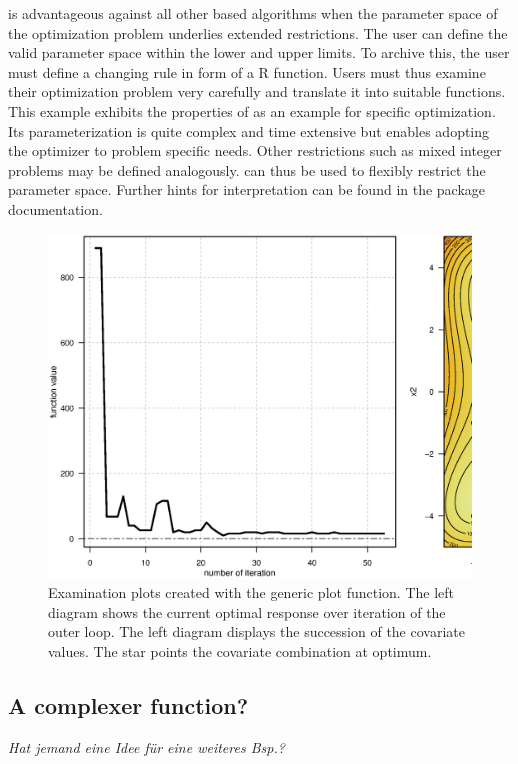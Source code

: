  is advantageous against all other  based algorithms when the parameter space of the optimization problem underlies extended restrictions. The user can define the valid parameter space within the lower and upper limits. To archive this, the user must define a changing rule in form of a R function. Users must thus examine their optimization problem very carefully and translate it into suitable functions. This example exhibits the properties of  as an example for specific optimization. Its parameterization is quite complex and time extensive but enables adopting the optimizer to problem specific needs. Other restrictions such as mixed integer problems may be defined analogously.  can thus be used to flexibly restrict the parameter space. Further hints for interpretation can be found in the package documentation.

\begin{figure}[htbp]
	\centering
	\includegraphics[width=1.01\textwidth]{Fig/fig2-ex2-plot.eps}
	\caption{Examination plots created with the generic plot function. The left diagram shows the current optimal response over iteration of the outer loop. The left diagram displays the succession of the covariate values. The star points the covariate combination at optimum.}
	\label{fig:fig2}
\end{figure}

\subsection{A complexer function?}
\textit{Hat jemand eine Idee für eine weiteres Bsp.?}
